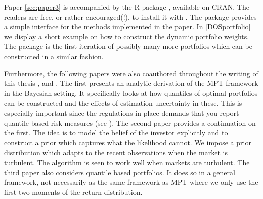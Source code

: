 \documentclass[oneside]{book}\usepackage{knitr}
\begin{document}
Paper \ref{sec:paper3} is accompanied by the R-package \citet{DOSPortfolio}, available on CRAN. 
The readers are free, or rather encouraged(!), to install it with \hlstd{(}\hlstd{)}. 
The package provides a simple interface for the methods implemented in the paper. 
In \ref{DOSportfolio} we display a short example on how to construct the dynamic portfolio weights. 
The package is the first iteration of possibly many more portfolios which can be constructed in a similar fashion.
\begin{knitrout}\small
{}\color{fgcolor}
\end{knitrout}
Furthermore, the following papers were also coauthored throughout the writing of this thesis \cite{bodnar2020quantile}, \cite{bodnar2021bayesian}  and \cite{bodnar2021quantile}.
The first presents an analytic derivation of the MPT framework in the Bayesian setting. 
It specifically looks at how quantiles of optimal portfolios can be constructed and the effects of estimation uncertainty in these. 
This is especially important since the regulations in place demands that you report quantile-based risk measures (see \citet{basel4}).
The second paper provides a continuation on the first. 
The idea is to model the belief of the investor explicitly and to construct a prior which captures what the likelihood cannot. 
We impose a prior distribution which adapts to the recent observations when the market is turbulent. 
The algorithm is seen to work well when markets are turbulent.
The third paper also considers quantile based portfolios. 
It does so in a general framework, not necessarily as the same framework as MPT where we only use the first two moments of the return distribution.
\end{document}
